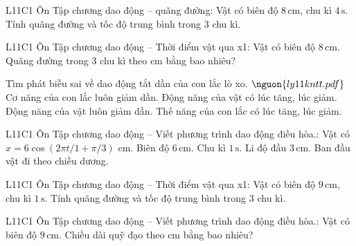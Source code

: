 \begin{ex}
L11C1 Ôn Tập chương dao động – quãng đường: Vật có biên độ $8\,\text{cm}$, chu kì $4\,\text{s}$. Tính quãng đường và tốc độ trung bình trong 3 chu kì.
\choiceTF

\end{ex}

\begin{ex}
L11C1 Ôn Tập chương dao động – Thời điểm vật qua x1: Vật có biên độ $8\,\text{cm}$. Quãng đường trong 3 chu kì theo cm bằng bao nhiêu?
\end{ex}

\begin{ex}
Tìm phát biễu sai về dao động tắt dần của con lắc lò xo. $\nguon{ly11 kntt.pdf}$
\choice
{Cơ năng của con lắc luôn giảm dần.}
{Động năng của vật có lúc tăng, lúc giảm.}
{\True Động năng của vật luôn giảm dần.}
{Thế năng của con lắc có lúc tăng, lúc giảm.}
\end{ex}

\begin{ex}
L11C1 Ôn Tập chương dao động – Viết phương trình dao động điều hòa.: Vật có $x=6\cos(2\pi t/1+\pi/3)$ cm.
\choiceTF
{\True Biên độ $6\,\text{cm}$.}
{\True Chu kì $1\,\text{s}$.}
{\True Li độ đầu $3\,\text{cm}$.}
{Ban đầu vật đi theo chiều dương.}
\end{ex}

\begin{ex}
L11C1 Ôn Tập chương dao động – Thời điểm vật qua x1: Vật có biên độ $9\,\text{cm}$, chu kì $1\,\text{s}$. Tính quãng đường và tốc độ trung bình trong 3 chu kì.
\choiceTF

\end{ex}

\begin{ex}
L11C1 Ôn Tập chương dao động – Viết phương trình dao động điều hòa.: Vật có biên độ $9\,\text{cm}$. Chiều dài quỹ đạo theo cm bằng bao nhiêu?
\end{ex}


